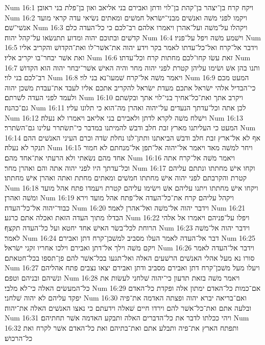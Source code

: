 Num 16:1  ויקח קרח בן־יצהר בן־קהת בן־לוי ודתן ואבירם בני אליאב ואון בן־פלת בני ראובן׃
Num 16:2  ויקמו לפני משׁה ואנשׁים מבני־ישׂראל חמשׁים ומאתים נשׂיאי עדה קראי מועד אנשׁי־שׁם׃
Num 16:3  ויקהלו על־משׁה ועל־אהרן ויאמרו אלהם רב־לכם כי כל־העדה כלם קדשׁים ובתוכם יהוה ומדוע תתנשׂאו על־קהל יהוה׃
Num 16:4  וישׁמע משׁה ויפל על־פניו׃
Num 16:5  וידבר אל־קרח ואל־כל־עדתו לאמר בקר וידע יהוה את־אשׁר־לו ואת־הקדושׁ והקריב אליו ואת אשׁר יבחר־בו יקריב אליו׃
Num 16:6  זאת עשׂו קחו־לכם מחתות קרח וכל־עדתו׃
Num 16:7  ותנו בהן אשׁ ושׂימו עליהן קטרת לפני יהוה מחר והיה האישׁ אשׁר־יבחר יהוה הוא הקדושׁ רב־לכם בני לוי׃
Num 16:8  ויאמר משׁה אל־קרח שׁמעו־נא בני לוי׃
Num 16:9  המעט מכם כי־הבדיל אלהי ישׂראל אתכם מעדת ישׂראל להקריב אתכם אליו לעבד את־עבדת משׁכן יהוה ולעמד לפני העדה לשׁרתם׃
Num 16:10  ויקרב אתך ואת־כל־אחיך בני־לוי אתך ובקשׁתם גם־כהנה׃
Num 16:11  לכן אתה וכל־עדתך הנעדים על־יהוה ואהרן מה־הוא כי תלונו עליו׃
Num 16:12  וישׁלח משׁה לקרא לדתן ולאבירם בני אליאב ויאמרו לא נעלה׃
Num 16:13  המעט כי העליתנו מארץ זבת חלב ודבשׁ להמיתנו במדבר כי־תשׂתרר עלינו גם־השׂתרר׃
Num 16:14  אף לא אל־ארץ זבת חלב ודבשׁ הביאתנו ותתן־לנו נחלת שׂדה וכרם העיני האנשׁים ההם תנקר לא נעלה׃
Num 16:15  ויחר למשׁה מאד ויאמר אל־יהוה אל־תפן אל־מנחתם לא חמור אחד מהם נשׂאתי ולא הרעתי את־אחד מהם׃
Num 16:16  ויאמר משׁה אל־קרח אתה וכל־עדתך היו לפני יהוה אתה והם ואהרן מחר׃
Num 16:17  וקחו אישׁ מחתתו ונתתם עליהם קטרת והקרבתם לפני יהוה אישׁ מחתתו חמשׁים ומאתים מחתת ואתה ואהרן אישׁ מחתתו׃
Num 16:18  ויקחו אישׁ מחתתו ויתנו עליהם אשׁ וישׂימו עליהם קטרת ויעמדו פתח אהל מועד ומשׁה ואהרן׃
Num 16:19  ויקהל עליהם קרח את־כל־העדה אל־פתח אהל מועד וירא כבוד־יהוה אל־כל־העדה׃
Num 16:20  וידבר יהוה אל־משׁה ואל־אהרן לאמר׃
Num 16:21  הבדלו מתוך העדה הזאת ואכלה אתם כרגע׃
Num 16:22  ויפלו על־פניהם ויאמרו אל אלהי הרוחת לכל־בשׂר האישׁ אחד יחטא ועל כל־העדה תקצף׃
Num 16:23  וידבר יהוה אל־משׁה לאמר׃
Num 16:24  דבר אל־העדה לאמר העלו מסביב למשׁכן־קרח דתן ואבירם׃
Num 16:25  ויקם משׁה וילך אל־דתן ואבירם וילכו אחריו זקני ישׂראל׃
Num 16:26  וידבר אל־העדה לאמר סורו נא מעל אהלי האנשׁים הרשׁעים האלה ואל־תגעו בכל־אשׁר להם פן־תספו בכל־חטאתם׃
Num 16:27  ויעלו מעל משׁכן־קרח דתן ואבירם מסביב ודתן ואבירם יצאו נצבים פתח אהליהם ונשׁיהם ובניהם וטפם׃
Num 16:28  ויאמר משׁה בזאת תדעון כי־יהוה שׁלחני לעשׂות את כל־המעשׂים האלה כי־לא מלבי׃
Num 16:29  אם־כמות כל־האדם ימתון אלה ופקדת כל־האדם יפקד עליהם לא יהוה שׁלחני׃
Num 16:30  ואם־בריאה יברא יהוה ופצתה האדמה את־פיה ובלעה אתם ואת־כל־אשׁר להם וירדו חיים שׁאלה וידעתם כי נאצו האנשׁים האלה את־יהוה׃
Num 16:31  ויהי ככלתו לדבר את כל־הדברים האלה ותבקע האדמה אשׁר תחתיהם׃
Num 16:32  ותפתח הארץ את־פיה ותבלע אתם ואת־בתיהם ואת כל־האדם אשׁר לקרח ואת כל־הרכושׁ׃
